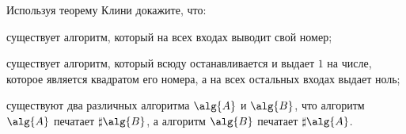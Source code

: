 Используя теорему Клини докажите, что:
\begin{enumcyr}
    \item существует алгоритм, который на всех входах выводит свой номер;
    \item существует алгоритм, который всюду останавливается и выдает $1$ на числе, которое является
        квадратом его номера, а на всех остальных входах выдает ноль;
    \item существуют два различных алгоритма $\alg{A}$ и $\alg{B}$, что алгоритм $\alg{A}$ печатает
        $\sharp \alg{B}$, а алгоритм $\alg{B}$ печатает $\sharp \alg{A}$.
\end{enumcyr}
